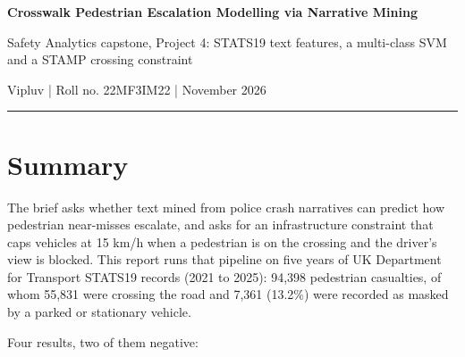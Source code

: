 \documentclass[10pt,a4paper]{article}
\begin{document}
{\LARGE\bfseries Crosswalk Pedestrian Escalation Modelling via Narrative Mining\par}\vspace{4pt}

{\large Safety Analytics capstone, Project 4: STATS19 text features, a multi-class SVM and a STAMP crossing constraint\par}\vspace{4pt}

Vipluv  |  Roll no. 22MF3IM22  |  November 2026\par\vspace{2pt}\hrule\vspace{6pt}

\section*{Summary}

The brief asks whether text mined from police crash narratives can predict how pedestrian near-misses escalate, and asks for an infrastructure constraint that caps vehicles at 15 km/h when a pedestrian is on the crossing and the driver's view is blocked. This report runs that pipeline on five years of UK Department for Transport STATS19 records (2021 to 2025): 94,398 pedestrian casualties, of whom 55,831 were crossing the road and 7,361 (13.2\%) were recorded as masked by a parked or stationary vehicle.\par

Four results, two of them negative:\par
\end{document}
